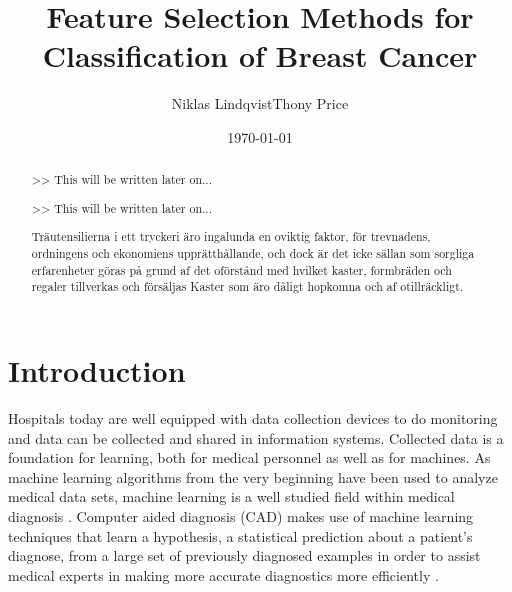 \documentclass{kththesis}
\title{Feature Selection Methods for Classification of Breast Cancer}
\author{Niklas Lindqvist\newline Thony Price}
\date{\today}
\begin{document}
\frontmatter

\titlepage

\begin{abstract}
  >> This will be written later on...

  \blindtext
\end{abstract}


\begin{otherlanguage}{swedish}
  \begin{abstract}

    >> This will be written later on...

    Träutensilierna i ett tryckeri äro ingalunda en oviktig faktor,
    för trevnadens, ordningens och ekonomiens upprätthållande, och
    dock är det icke sällan som sorgliga erfarenheter göras på grund
    af det oförstånd med hvilket kaster, formbräden och regaler
    tillverkas och försäljas Kaster som äro dåligt hopkomna och af
    otillräckligt.
  \end{abstract}
\end{otherlanguage}


\tableofcontents


\mainmatter


\chapter{Introduction}


Hospitals today are well equipped with data collection devices to do monitoring and data can be collected and shared in information systems. Collected data is a foundation for learning, both for medical personnel as well as for machines. As machine learning algorithms from the very beginning have been used to analyze medical data sets, machine learning is a well studied field within medical diagnosis \parencite{kononenko2001}. Computer aided diagnosis (CAD) makes use of machine learning techniques that learn a hypothesis, a statistical prediction about a patient's diagnose, from a large set of previously diagnosed examples in order to assist medical experts in making more accurate diagnostics more efficiently \parencite{li2007}.
\end{document}
